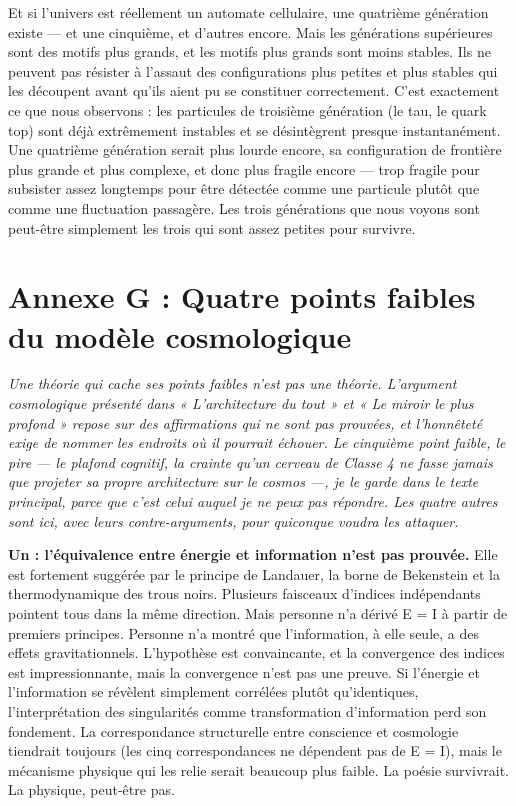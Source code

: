 \documentclass[11pt, twoside, openright]{book}
\begin{document}
Et si l'univers est réellement un automate cellulaire, une quatrième génération existe --- et une cinquième, et d'autres encore. Mais les générations supérieures sont des motifs plus grands, et les motifs plus grands sont moins stables. Ils ne peuvent pas résister à l'assaut des configurations plus petites et plus stables qui les découpent avant qu'ils aient pu se constituer correctement. C'est exactement ce que nous observons : les particules de troisième génération (le tau, le quark top) sont déjà extrêmement instables et se désintègrent presque instantanément. Une quatrième génération serait plus lourde encore, sa configuration de frontière plus grande et plus complexe, et donc plus fragile encore --- trop fragile pour subsister assez longtemps pour être détectée comme une particule plutôt que comme une fluctuation passagère. Les trois générations que nous voyons sont peut-être simplement les trois qui sont assez petites pour survivre.


\chapter*{Annexe G : Quatre points faibles du modèle cosmologique}

\textit{Une théorie qui cache ses points faibles n'est pas une théorie. L'argument cosmologique présenté dans « L'architecture du tout » et « Le miroir le plus profond » repose sur des affirmations qui ne sont pas prouvées, et l'honnêteté exige de nommer les endroits où il pourrait échouer. Le cinquième point faible, le pire --- le plafond cognitif, la crainte qu'un cerveau de Classe 4 ne fasse jamais que projeter sa propre architecture sur le cosmos ---, je le garde dans le texte principal, parce que c'est celui auquel je ne peux pas répondre. Les quatre autres sont ici, avec leurs contre-arguments, pour quiconque voudra les attaquer.}

\textbf{Un : l'équivalence entre énergie et information n'est pas prouvée.} Elle est fortement suggérée par le principe de Landauer, la borne de Bekenstein et la thermodynamique des trous noirs. Plusieurs faisceaux d'indices indépendants pointent tous dans la même direction. Mais personne n'a dérivé E = I à partir de premiers principes. Personne n'a montré que l'information, à elle seule, a des effets gravitationnels. L'hypothèse est convaincante, et la convergence des indices est impressionnante, mais la convergence n'est pas une preuve. Si l'énergie et l'information se révèlent simplement corrélées plutôt qu'identiques, l'interprétation des singularités comme transformation d'information perd son fondement. La correspondance structurelle entre conscience et cosmologie tiendrait toujours (les cinq correspondances ne dépendent pas de E = I), mais le mécanisme physique qui les relie serait beaucoup plus faible. La poésie survivrait. La physique, peut-être pas.
\end{document}
